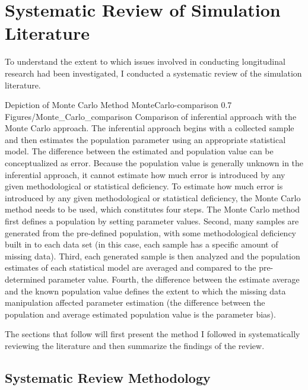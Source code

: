 \documentclass[
12pt, %
twoside,
english]{guelphthesis}
\begin{document}
\hypertarget{systematic-review-of-simulation-literature}{%
\section{Systematic Review of Simulation Literature}\label{systematic-review-of-simulation-literature}}

To understand the extent to which issues involved in conducting longitudinal research had been investigated, I conducted a systematic review of the simulation literature.
\begin{apaFigure}
[landscape]
[samepage]
[0cm]
{Depiction of Monte Carlo Method}
{MonteCarlo-comparison}
{0.7}
{Figures/Monte_Carlo_comparison}
{Comparison of inferential approach with the Monte Carlo approach. The inferential approach begins with a collected sample and then estimates the population parameter using an appropriate statistical model. The difference between the estimated and population value can be conceptualized as error. Because the population value is generally unknown in the inferential approach, it cannot estimate how much error is introduced by any given methodological or statistical deficiency. To estimate how much error is introduced by any given methodological or statistical deficiency, the Monte Carlo method needs to be used, which constitutes four steps. The Monte Carlo method first defines a population by setting parameter values. Second, many samples are generated from the pre-defined population, with some methodological deficiency built in to each data set (in this case, each sample has a specific amount of missing data). Third, each generated sample is then analyzed and the population estimates of each statistical model are averaged and compared to the pre-determined parameter value. Fourth, the difference between the estimate average and the known population value defines the extent to which the missing data manipulation affected parameter estimation (the difference between the population and average estimated population value is the parameter bias).}
\end{apaFigure}
The sections that follow will first present the method I followed in systematically reviewing the literature and then summarize the findings of the review.

\hypertarget{systematic-review-methodology}{%
\subsection{Systematic Review Methodology}\label{systematic-review-methodology}}
\end{document}
